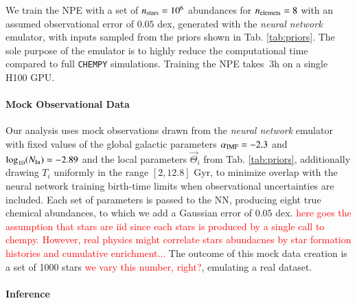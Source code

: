 \documentclass{aa}
\begin{document}

We train the NPE with a set of $n_{\rm stars}=10^6$ abundances for $n_{\rm elemets}=8$ with an assumed observational error of $0.05$ dex, generated with the \textit{neural network} emulator, with inputs sampled from the priors shown in Tab. \ref{tab:priors}. The sole purpose of the emulator is to highly reduce the computational time compared to full \texttt{CHEMPY} simulations. Training the NPE takes $~3$h on a single H100 GPU.

\paragraph{Mock Observational Data}
Our analysis uses mock observations drawn from the \textit{neural network} emulator with fixed values of the global galactic parameters $\alpha_{\rm IMF}=-2.3$ and $\log_{10}(N_{\rm Ia})=-2.89$ and the local parameters $\vec{\Theta}_i$ from Tab. \ref{tab:priors}, additionally drawing $T_i$ uniformly in the range $[2,12.8]$ Gyr, to minimize overlap with the neural network training birth-time limits when observational uncertainties are included. 
Each set of parameters is passed to the NN, producing eight true chemical abundances, to which we add a Gaussian error of $0.05$ dex.
\textcolor{red}{here goes the assumption that stars are iid since each stars is produced by a single call to chempy. However, real physics might correlate stars abundacnes by star formation histories and cumulative enrichment...}
The outcome of this mock data creation is a set of 1000 stars \textcolor{red}{we vary this number, right?}, emulating a real dataset.

\paragraph{Inference}

\end{document}
